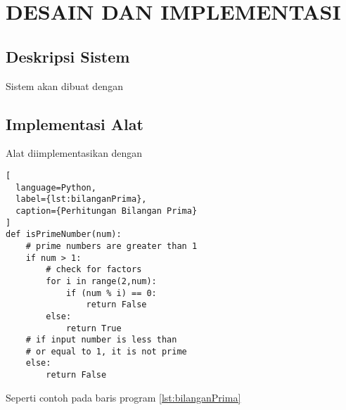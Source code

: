 \chapter{DESAIN DAN IMPLEMENTASI}
\vspace{4ex}

\setlength{\parindent}{7ex}

\section{Deskripsi Sistem}
\vspace{1ex}

Sistem akan dibuat dengan \lipsum[1]
\vspace{0.5ex}

\lipsum[2]
\vspace{0.5ex}

\newpage

\section{Implementasi Alat}
\vspace{1ex}

Alat diimplementasikan dengan \lipsum[3]
\vspace{0.5ex}

\begin{lstlisting}[
  language=Python,
  label={lst:bilanganPrima},
  caption={Perhitungan Bilangan Prima}
]
def isPrimeNumber(num):
    # prime numbers are greater than 1
    if num > 1:
        # check for factors
        for i in range(2,num):
            if (num % i) == 0:
                return False
        else:
            return True
    # if input number is less than
    # or equal to 1, it is not prime
    else:
        return False
\end{lstlisting}

Seperti contoh pada baris program \ref{lst:bilanganPrima} \lipsum[4]
\vspace{0.5ex}